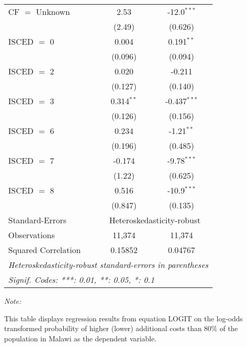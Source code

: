 \begin{table}[htbp!]
\begin{adjustbox}{width = 1\textwidth, max height = 0.95\textheight, center}
\begin{threeparttable}[b]
\begin{tabular}{lcc}
            CF $=$ Unknown       & 2.53           & -12.0$^{***}$\\   
                                 & (2.49)         & (0.626)\\   
            ISCED $=$ 0          & 0.004          & 0.191$^{**}$\\   
                                 & (0.096)        & (0.094)\\   
            ISCED $=$ 2          & 0.020          & -0.211\\   
                                 & (0.127)        & (0.140)\\   
            ISCED $=$ 3          & 0.314$^{**}$   & -0.437$^{***}$\\   
                                 & (0.126)        & (0.156)\\   
            ISCED $=$ 6          & 0.234          & -1.21$^{**}$\\   
                                 & (0.196)        & (0.485)\\   
            ISCED $=$ 7          & -0.174         & -9.78$^{***}$\\   
                                 & (1.22)         & (0.625)\\   
            ISCED $=$ 8          & 0.516          & -10.9$^{***}$\\   
                                 & (0.847)        & (0.135)\\   
            \midrule 
            Standard-Errors & \multicolumn{2}{c}{Heteroskedasticity-robust} \\ 
            Observations         & 11,374         & 11,374\\  
            Squared Correlation  & 0.15852        & 0.04767\\  
            \midrule \midrule
            \multicolumn{3}{l}{\emph{Heteroskedasticity-robust standard-errors in parentheses}}\\
            \multicolumn{3}{l}{\emph{Signif. Codes: ***: 0.01, **: 0.05, *: 0.1}}\\
         \end{tabular}
         
         \begin{tablenotes}\item \medskip \textit{Note:}
            \item This table displays regression results from equation LOGIT on the log-odds transformed probability of higher (lower) additional costs than 80\% of the population in Malawi as the dependent variable. 
         \end{tablenotes}
      \end{threeparttable}
   \end{adjustbox}
\end{table}


